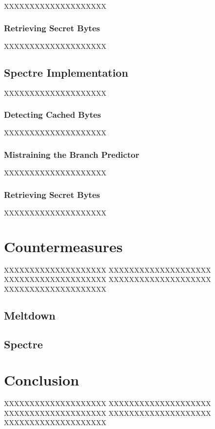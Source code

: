 \documentclass[a4paper,oneside,openright] {scrreprt}
\begin{document}
XXXXXXXXXXXXXXXXXXXX

\subsection{Retrieving Secret Bytes}
\label{ch:intro:motivation:A}

XXXXXXXXXXXXXXXXXXXX

\section{Spectre Implementation}
\label{ch:intro:motivation}

XXXXXXXXXXXXXXXXXXXX

\subsection{Detecting Cached Bytes}
\label{ch:intro:motivation:A}

XXXXXXXXXXXXXXXXXXXX

\subsection{Mistraining the Branch Predictor}
\label{ch:intro:motivation:A}

XXXXXXXXXXXXXXXXXXXX

\subsection{Retrieving Secret Bytes}
\label{ch:intro:motivation:A}

XXXXXXXXXXXXXXXXXXXX

\chapter{Countermeasures}
\label{ch:countermeasures}

XXXXXXXXXXXXXXXXXXXX
XXXXXXXXXXXXXXXXXXXX
XXXXXXXXXXXXXXXXXXXX
XXXXXXXXXXXXXXXXXXXX
XXXXXXXXXXXXXXXXXXXX

\section{Meltdown}
\label{ch:intro:motivation}

\section{Spectre}
\label{ch:intro:motivation}


\chapter{Conclusion}
\label{ch:conclusion}

XXXXXXXXXXXXXXXXXXXX
XXXXXXXXXXXXXXXXXXXX
XXXXXXXXXXXXXXXXXXXX
XXXXXXXXXXXXXXXXXXXX
XXXXXXXXXXXXXXXXXXXX



\end{document}

